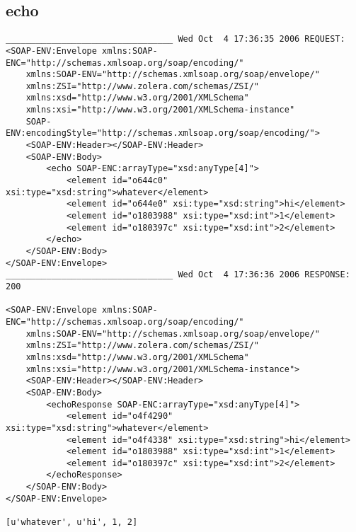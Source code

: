 \subsection{echo}
\begin{verbatim}
_________________________________ Wed Oct  4 17:36:35 2006 REQUEST:
<SOAP-ENV:Envelope xmlns:SOAP-ENC="http://schemas.xmlsoap.org/soap/encoding/" 
	xmlns:SOAP-ENV="http://schemas.xmlsoap.org/soap/envelope/" 
	xmlns:ZSI="http://www.zolera.com/schemas/ZSI/" 
	xmlns:xsd="http://www.w3.org/2001/XMLSchema" 
	xmlns:xsi="http://www.w3.org/2001/XMLSchema-instance" 
	SOAP-ENV:encodingStyle="http://schemas.xmlsoap.org/soap/encoding/">
	<SOAP-ENV:Header></SOAP-ENV:Header>
	<SOAP-ENV:Body>
		<echo SOAP-ENC:arrayType="xsd:anyType[4]">
			<element id="o644c0" xsi:type="xsd:string">whatever</element>
			<element id="o644e0" xsi:type="xsd:string">hi</element>
			<element id="o1803988" xsi:type="xsd:int">1</element>
			<element id="o180397c" xsi:type="xsd:int">2</element>
		</echo>
	</SOAP-ENV:Body>
</SOAP-ENV:Envelope>
_________________________________ Wed Oct  4 17:36:36 2006 RESPONSE:
200

<SOAP-ENV:Envelope xmlns:SOAP-ENC="http://schemas.xmlsoap.org/soap/encoding/" 
	xmlns:SOAP-ENV="http://schemas.xmlsoap.org/soap/envelope/" 
	xmlns:ZSI="http://www.zolera.com/schemas/ZSI/" 
	xmlns:xsd="http://www.w3.org/2001/XMLSchema" 
	xmlns:xsi="http://www.w3.org/2001/XMLSchema-instance">
	<SOAP-ENV:Header></SOAP-ENV:Header>
	<SOAP-ENV:Body>
		<echoResponse SOAP-ENC:arrayType="xsd:anyType[4]">
			<element id="o4f4290" xsi:type="xsd:string">whatever</element>
			<element id="o4f4338" xsi:type="xsd:string">hi</element>
			<element id="o1803988" xsi:type="xsd:int">1</element>
			<element id="o180397c" xsi:type="xsd:int">2</element>
		</echoResponse>
	</SOAP-ENV:Body>
</SOAP-ENV:Envelope>

[u'whatever', u'hi', 1, 2]
\end{verbatim}

